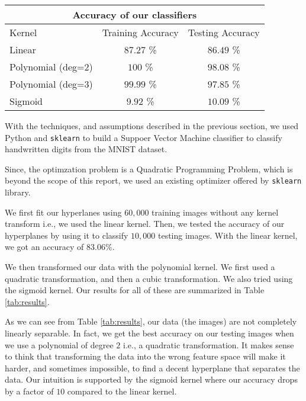
\begin{table*}[!htb]
	\centering
	\begin{tabular}{lcc}
		\toprule
		\multicolumn{3}{c}{\textbf{Accuracy of our classifiers}} \\
		\midrule
		Kernel & Training Accuracy & Testing Accuracy \\
		\midrule
		Linear & $87.27$ \% & $86.49$ \% \\
		Polynomial (deg=$2$) & $100$ \% & $98.08$ \% \\
		Polynomial (deg=$3$) & $99.99$ \% & $97.85$ \% \\
		Sigmoid & $9.92$ \% & $10.09$ \% \\
		\bottomrule
	\end{tabular}
	\caption{Accuracy of different classifiers}
	\label{tab:results}
\end{table*}

With the techniques, and assumptions described in the previous section, we used Python and \texttt{sklearn}\cite{scikit-learn} to build a Suppoer Vector Machine classifier to classify handwritten digits from the MNIST dataset.

Since, the optimzation problem is a Quadratic Programming Problem, which is beyond the scope of this report, we used an existing optimizer offered by \texttt{sklearn} library.

We first fit our hyperlanes using $60,000$ training images without any kernel transform i.e., we used the linear kernel. Then, we tested the accuracy of our hyperplanes by using it to classify $10,000$ testing images. With the linear kernel, we got an accuracy of $83.06 \%$.

We then transformed our data with the polynomial kernel. We first used a quadratic transformation, and then a cubic transformation. We also tried using the sigmoid kernel. Our results for all of these are summarized in Table \ref{tab:results}.

As we can see from Table \ref{tab:results}, our data (the images) are not completely linearly separable. In fact, we get the best accuracy on our testing images when we use a polynomial of degree $2$ i.e., a quadratic transformation. It makes sense to think that transforming the data into the wrong feature space will make it harder, and sometimes impossible, to find a decent hyperplane that separates the data. Our intuition is supported by the sigmoid kernel where our accuracy drops by a factor of $10$ compared to the linear kernel.
